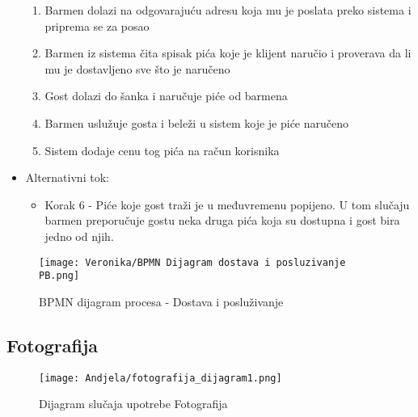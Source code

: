 \documentclass[a4paper]{article}
\begin{document}
\begin{itemize}
\begin{enumerate}
		    \item Barmen dolazi na odgovarajuću adresu koja mu je poslata preko sistema i priprema se za posao
            \item Barmen iz sistema čita spisak pića koje je klijent naručio i proverava da li mu je dostavljeno sve što je naručeno
           \item Gost dolazi do šanka i naručuje piće od barmena
		   \item Barmen uslužuje gosta i beleži u sistem koje je piće naručeno
		   \item Sistem dodaje cenu tog pića na račun korisnika
        \end{enumerate}
     \item Alternativni tok:
        \begin{itemize}
	      \item	Korak 6 - Piće koje gost traži je u međuvremenu popijeno. U tom slučaju barmen preporučuje gostu neka druga pića koja su dostupna i gost bira jedno od njih.  
	      \end{itemize}
\end{itemize}


\begin{figure}[H]
    \centering
    \texttt{[image: Veronika/BPMN Dijagram dostava i posluzivanje PB.png]}
    \caption{BPMN dijagram procesa - Dostava i posluživanje}
    \label{fig:PrenosiviBar}
\end{figure}


\subsection{Fotografija}

\begin{figure}[H]
    \centering
    \texttt{[image: Andjela/fotografija\_dijagram1.png]}
    \caption{Dijagram slučaja upotrebe Fotografija}
    \label{fig:PrenosiviBar}
\end{figure}
\end{document}
